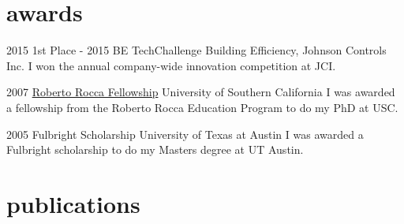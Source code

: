 \documentclass[]{friggeri-cv} %
\begin{document}
\section{awards}

\begin{entrylist}


\entry
{2015}
{1st Place - 2015 BE TechChallenge}
{Building Efficiency, Johnson Controls Inc.}
{I won the annual company-wide innovation competition at JCI.}

\entry
{2007}
{\href{http://www.robertorocca.org/en/fellowships/fellows07.aspx}{Roberto Rocca Fellowship}}
{University of Southern California}
{I was awarded a fellowship from the Roberto Rocca Education Program to do my PhD at USC.}

\entry
{2005}
{Fulbright Scholarship}
{University of Texas at Austin}
{I was awarded a Fulbright scholarship to do my Masters degree at UT Austin.}


\end{entrylist}





\section{publications}


\enlargethispage*{1cm}
\end{document}
